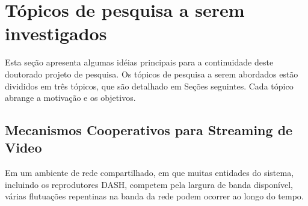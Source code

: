 \clearpage
\section{Tópicos de pesquisa a serem investigados}
\label{ch:proposal}

Esta seção apresenta algumas idéias principais para a continuidade deste doutorado
projeto de pesquisa. Os tópicos de pesquisa a serem abordados estão divididos em três tópicos, que são
detalhado em Seções seguintes.
Cada tópico abrange a motivação e os objetivos.



\subsection{Mecanismos Cooperativos para Streaming de Video}
\label{subsec:video-streaming}


Em um ambiente de rede compartilhado, em que muitas entidades do sistema, incluindo os reprodutores DASH, competem pela largura de banda disponível, várias flutuações repentinas na banda da rede podem ocorrer ao longo do tempo.

